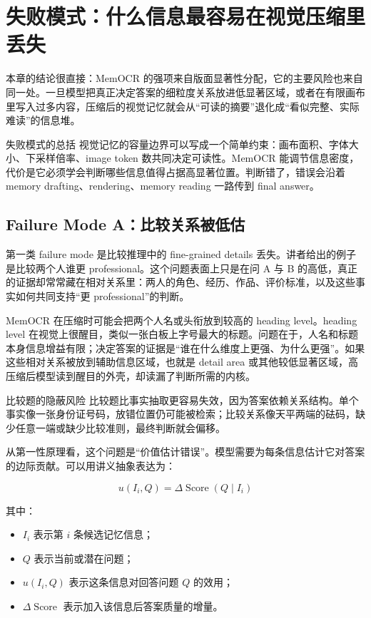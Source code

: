 \section{失败模式：什么信息最容易在视觉压缩里丢失}

本章的结论很直接：MemOCR 的强项来自版面显著性分配，它的主要风险也来自同一处。一旦模型把真正决定答案的细粒度关系放进低显著区域，或者在有限画布里写入过多内容，压缩后的视觉记忆就会从“可读的摘要”退化成“看似完整、实际难读”的信息堆。

\begin{importantbox}{失败模式的总括}
视觉记忆的容量边界可以写成一个简单约束：画布面积、字体大小、下采样倍率、image token 数共同决定可读性。MemOCR 能调节信息密度，代价是它必须学会判断哪些信息值得占据高显著位置。判断错了，错误会沿着 memory drafting、rendering、memory reading 一路传到 final answer。
\end{importantbox}

\subsection{Failure Mode A：比较关系被低估}

第一类 failure mode 是比较推理中的 fine-grained details 丢失。讲者给出的例子是比较两个人谁更 professional。这个问题表面上只是在问 A 与 B 的高低，真正的证据却常常藏在相对关系里：两人的角色、经历、作品、评价标准，以及这些事实如何共同支持“更 professional”的判断。

MemOCR 在压缩时可能会把两个人名或头衔放到较高的 heading level。heading level 在视觉上很醒目，类似一张白板上字号最大的标题。问题在于，人名和标题本身信息增益有限；决定答案的证据是“谁在什么维度上更强、为什么更强”。如果这些相对关系被放到辅助信息区域，也就是 detail area 或其他较低显著区域，高压缩后模型读到醒目的外壳，却读漏了判断所需的内核。

\begin{warningbox}{比较题的隐蔽风险}
比较题比事实抽取更容易失效，因为答案依赖关系结构。单个事实像一张身份证号码，放错位置仍可能被检索；比较关系像天平两端的砝码，缺少任意一端或缺少比较准则，最终判断就会偏移。
\end{warningbox}

从第一性原理看，这个问题是“价值估计错误”。模型需要为每条信息估计它对答案的边际贡献。可以用讲义抽象表达为：

$$
u(I_i, Q) = \Delta \operatorname{Score}(Q \mid I_i)
$$

其中：

\begin{itemize}
  \item $I_i$ 表示第 $i$ 条候选记忆信息；
  \item $Q$ 表示当前或潜在问题；
  \item $u(I_i, Q)$ 表示这条信息对回答问题 $Q$ 的效用；
  \item $\Delta \operatorname{Score}$ 表示加入该信息后答案质量的增量。
\end{itemize}

